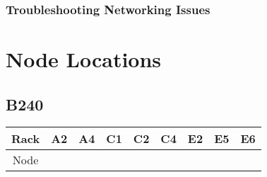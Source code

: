 \documentclass[10pt,letterpaper]{article}
\begin{document}
        \subsubsection{Troubleshooting Networking Issues}

\clearpage


\appendix
\section{Node Locations}
    \subsection{B240}
        \begin{center}
        \begin{tabular}{ |c|c|c|c|c|c|c|c|c| }
        \hline
        Rack & A2 & A4 & C1 & C2 & C4 & E2 & E5 & E6 \\
        \hline
        \multirow{1}{3em}{Node}


\end{tabular}
\end{center}
\end{document}
